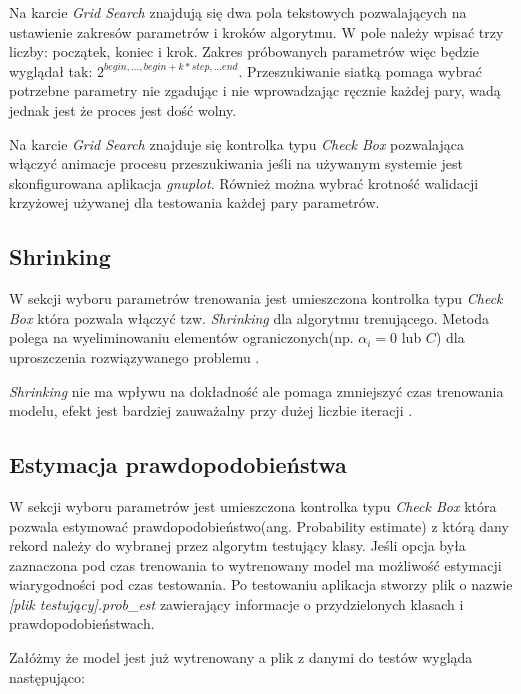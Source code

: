 \documentclass[paper=a4, fontsize=11pt]{scrartcl} %
\numberwithin{equation}{section} %
\numberwithin{figure}{section} %
\begin{document}
    \par Na karcie \textit{Grid Search} znajdują się dwa pola tekstowych pozwalających na ustawienie
    zakresów parametrów i kroków algorytmu. W pole należy wpisać trzy liczby: początek, koniec
    i krok. Zakres próbowanych parametrów więc będzie wyglądał tak:
    $2^{begin,...,begin+k*step,...end}$. Przeszukiwanie siatką pomaga wybrać potrzebne
    parametry nie zgadując i nie wprowadzając ręcznie każdej pary, wadą jednak jest że proces
    jest dość wolny. 
    \par Na karcie \textit{Grid Search} znajduje się kontrolka typu \textit{Check Box}
    pozwalająca włączyć animacje procesu przeszukiwania jeśli na używanym systemie jest
    skonfigurowana aplikacja \textit{gnuplot}. Również można wybrać krotność walidacji
    krzyżowej używanej dla testowania każdej pary parametrów. 

\subsection{Shrinking}
    \par W sekcji wyboru parametrów trenowania jest umieszczona kontrolka typu \textit{Check
    Box} która pozwala włączyć tzw. \textit{Shrinking} dla algorytmu trenującego. Metoda polega na
    wyeliminowaniu elementów ograniczonych(np.  $\alpha_i = 0$ lub $C$) dla uproszczenia
    rozwiązywanego problemu \cite{CC01a}. 
    \par \textit{Shrinking} nie ma wpływu na dokładność ale pomaga zmniejszyć czas trenowania
    modelu, efekt jest bardziej zauważalny przy dużej liczbie iteracji \cite{libsvm_faq}.

\subsection{Estymacja prawdopodobieństwa}
    \par W sekcji wyboru parametrów jest umieszczona kontrolka typu \textit{Check Box} która
    pozwala estymować prawdopodobieństwo(ang. Probability estimate) z którą dany rekord należy do
    wybranej przez algorytm testujący klasy. Jeśli opcja była zaznaczona pod czas trenowania to
    wytrenowany model ma możliwość estymacji wiarygodności pod czas testowania. Po testowaniu
    aplikacja stworzy plik o nazwie \textit{[plik testujący].prob\_est} zawierający informacje
    o przydzielonych klasach i prawdopodobieństwach.
    \par Załóżmy że model jest już wytrenowany a plik z danymi do testów wygląda następująco:
\end{document}
